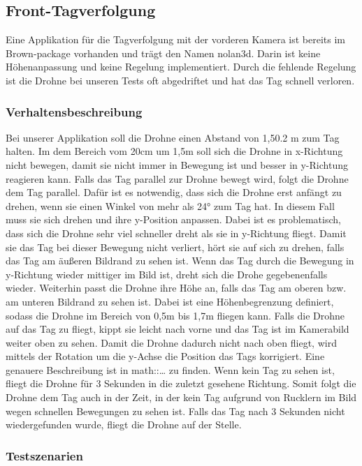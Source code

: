 \subsection*{Front-\/Tagverfolgung }

Eine Applikation für die Tagverfolgung mit der vorderen Kamera ist bereits im Brown-\/package vorhanden und trägt den Namen nolan3d. Darin ist keine Höhenanpassung und keine Regelung implementiert. Durch die fehlende Regelung ist die Drohne bei unseren Tests oft abgedriftet und hat das Tag schnell verloren.

\subsubsection*{Verhaltensbeschreibung }

Bei unserer Applikation soll die Drohne einen Abstand von 1,50.2 m zum Tag halten. Im dem Bereich vom 20cm um 1,5m soll sich die Drohne in x-\/Richtung nicht bewegen, damit sie nicht immer in Bewegung ist und besser in y-\/Richtung reagieren kann. Falls das Tag parallel zur Drohne bewegt wird, folgt die Drohne dem Tag parallel. Dafür ist es notwendig, dass sich die Drohne erst anfängt zu drehen, wenn sie einen Winkel von mehr als 24° zum Tag hat. In diesem Fall muss sie sich drehen und ihre y-\/Position anpassen. Dabei ist es problematisch, dass sich die Drohne sehr viel schneller dreht als sie in y-\/Richtung fliegt. Damit sie das Tag bei dieser Bewegung nicht verliert, hört sie auf sich zu drehen, falls das Tag am äußeren Bildrand zu sehen ist. Wenn das Tag durch die Bewegung in y-\/Richtung wieder mittiger im Bild ist, dreht sich die Drohe gegebenenfalls wieder. Weiterhin passt die Drohne ihre Höhe an, falls das Tag am oberen bzw. am unteren Bildrand zu sehen ist. Dabei ist eine Höhenbegrenzung definiert, sodass die Drohne im Bereich von 0,5m bis 1,7m fliegen kann. Falls die Drohne auf das Tag zu fliegt, kippt sie leicht nach vorne und das Tag ist im Kamerabild weiter oben zu sehen. Damit die Drohne dadurch nicht nach oben fliegt, wird mittels der Rotation um die y-\/Achse die Position das Tags korrigiert. Eine genauere Beschreibung ist in math::… zu finden. Wenn kein Tag zu sehen ist, fliegt die Drohne für 3 Sekunden in die zuletzt gesehene Richtung. Somit folgt die Drohne dem Tag auch in der Zeit, in der kein Tag aufgrund von Rucklern im Bild wegen schnellen Bewegungen zu sehen ist. Falls das Tag nach 3 Sekunden nicht wiedergefunden wurde, fliegt die Drohne auf der Stelle.

\subsubsection*{Testszenarien }

